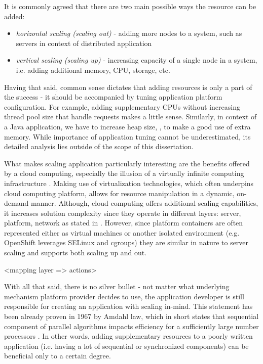 It is commonly agreed that there are two main possible ways the resource can be added:
\begin{itemize}
	\item \textit{horizontal scaling (scaling out)} - adding more nodes to a system, such as servers in context of distributed application
	\item \textit{vertical scaling (scaling up)} - increasing capacity of a single node in a system, i.e. adding additional memory, CPU, storage, etc.
\end{itemize}

Having that said, common sense dictates that adding resources is only a part of the success - it should be accompanied by tuning application platform configuration. For example, adding supplementary CPUs without increasing thread pool size that handle requests makes a little sense. Similarly, in context of a Java application, we have to increase heap size, , to make a good use of extra memory. While importance of application tuning cannot be underestimated, its detailed analysis lies outside of the scope of this dissertation.

What makes scaling application particularly interesting are the benefits offered by a cloud computing, especially the illusion of a virtually infinite computing infrastructure \cite{VaRoBu11}. Making use of virtualization technologies, which often underpins cloud computing platform, allows for resource manipulation in a dynamic, on-demand manner. Although, cloud computing offers additional scaling capabilities, it increases solution complexity since they operate in different layers: server, platform, network as stated in \cite{VaRoBu11}. However, since platform containers are often represented either as virtual machines or another isolated environment (e.g. OpenShift leverages SELinux and cgroups) they are similar in nature to server scaling and supports both scaling up and out.

<mapping layer => actions>

With all that said, there is no silver bullet - not matter what underlying mechanism platform provider decides to use, the application developer is still responsible for creating an application with scaling in-mind. This statement has been already proven in 1967 by Amdahl law, which in short states that sequential component of parallel algorithms impacts efficiency for a sufficiently large number processors \cite{Am67}. In other words, adding supplementary resources to a poorly written application (i.e. having a lot of sequential or synchronized components) can be beneficial only to a certain degree.

